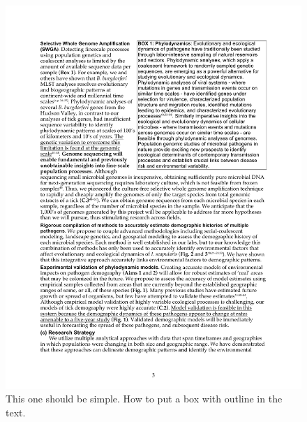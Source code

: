 \documentclass[letterpaper,12pt]{article}%
\begin{document}
\newpage
\begin{figure}[h!]
\centering
\includegraphics[scale=0.7]{BoxWrap.pdf}
\caption{This one should be simple. How to put a box with outline in the text.}
\label{fig:BoxWrap}
\end{figure}
\end{document}
